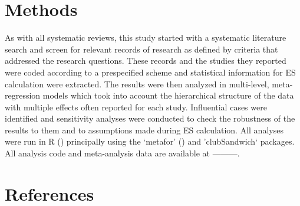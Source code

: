\documentclass[
  letterpaper,
  DIV=11,
  numbers=noendperiod]{scrartcl}
\begin{document}
\hypertarget{methods}{%
\section{Methods}\label{methods}}

As with all systematic reviews, this study started with a systematic
literature search and screen for relevant records of research as defined
by criteria that addressed the research questions. These records and the
studies they reported were coded according to a prespecified scheme and
statistical information for ES calculation were extracted. The results
were then analyzed in multi-level, meta-regression models which took
into account the hierarchical structure of the data with multiple
effects often reported for each study. Influential cases were identified
and sensitivity analyses were conducted to check the robustness of the
results to them and to assumptions made during ES calculation. All
analyses were run in R () principally using the `metafor' () and
'clubSandwich` packages. All analysis code and meta-analysis data are
available at ---------.

\hypertarget{references}{%
\section*{References}\label{references}}
\end{document}
